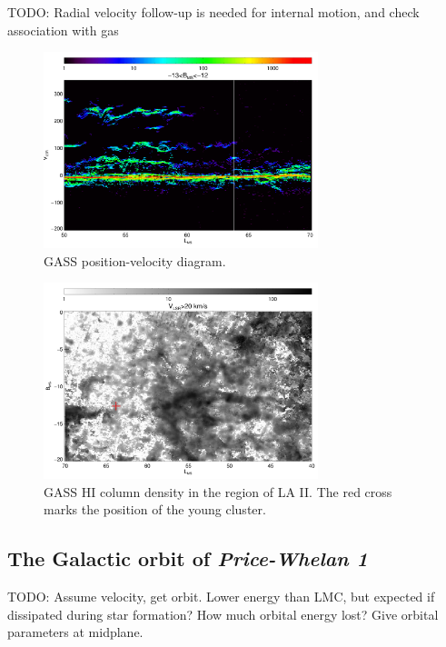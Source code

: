 \documentclass[twocolumn]{aastex62}
\newcommand{\todo}[1]{{\color{red} TODO: #1}}
\newcommand{\hi}{H{\footnotesize I} }
\newcommand{\clustername}{\textsl{Price-Whelan 1}}
\begin{document}
\todo{Radial velocity follow-up is needed for internal motion, and check association with gas}


\begin{figure}
\centering
\includegraphics[width=8cm]{gass_vlsrmlon.pdf}
\caption{GASS position-velocity diagram.}
\label{fig_gass}
\end{figure}

\begin{figure}
\centering
\includegraphics[width=8cm]{gass_mlatmlon.pdf}
\caption{GASS \hi column density in the region of LA II. The red cross marks the position
of the young cluster.}
\label{fig_gass}
\end{figure}


\subsection{The Galactic orbit of \clustername}
\label{sec:orbit}

\todo{Assume velocity, get orbit. Lower energy than LMC, but expected if dissipated during star formation? How much orbital energy lost? Give orbital parameters at midplane.}
\end{document}
